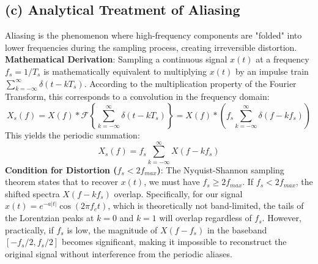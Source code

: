 \subsection*{(c) Analytical Treatment of Aliasing}
Aliasing is the phenomenon where high-frequency components are "folded" into
lower frequencies during the sampling process, creating irreversible distortion.
\textbf{Mathematical Derivation}:
Sampling a continuous signal $x(t)$ at a frequency $f_s = 1/T_s$ is mathematically
equivalent to multiplying $x(t)$ by an impulse train $\sum_{k=-\infty}^{\infty} \delta(t -
k T_s)$. According to the multiplication property of the Fourier Transform, this
corresponds to a convolution in the frequency domain:
\begin{equation*}
X_s(f) = X(f) * \mathcal{F}\left\{ \sum_{k=-\infty}^{\infty} \delta(t - k T_s) \right\} = X(f)
* \left( f_s \sum_{k=-\infty}^{\infty} \delta(f - k f_s) \right)
\end{equation*}
This yields the periodic summation:
\begin{equation*}
X_s(f) = f_s \sum_{k=-\infty}^{\infty} X(f - k f_s)
\end{equation*}
\textbf{Condition for Distortion ($f_s < 2f_{max}$)}:
The Nyquist-Shannon sampling theorem states that to recover $x(t)$, we must have
$f_s \ge 2f_{max}$. If $f_s < 2f_{max}$, the shifted spectra $X(f - k f_s)$ overlap.
Specifically, for our signal $x(t) = e^{-a|t|} \cos(2\pi f_c t)$, which is theoretically not
band-limited, the tails of the Lorentzian peaks at $k=0$ and $k=1$ will overlap
regardless of $f_s$. However, practically, if $f_s$ is low, the magnitude of $X(f - f_s)
$ in the baseband $[ -f_s/2, f_s/2 ]$ becomes significant, making it impossible to
reconstruct the original signal without interference from the periodic aliases.
